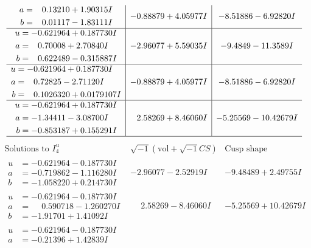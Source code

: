 \documentclass[1p]{elsarticle_modified}
\theoremstyle{definition}
\newcommand{\I}{\sqrt{-1}}
\begin{document}
$$\begin{array}{c|c|c}
\begin{aligned}
a &= \phantom{-}0.13210 + 1.90315 I \\
b &= \phantom{-}0.01117 - 1.83111 I\end{aligned}
 & -0.88879 + 4.05977 I & -8.51886 - 6.92820 I \\ \hline\begin{aligned}
u &= -0.621964 + 0.187730 I \\
a &= \phantom{-}0.70008 + 2.70840 I \\
b &= \phantom{-}0.622489 - 0.315887 I\end{aligned}
 & -2.96077 + 5.59035 I & -9.4849 - 11.3589 I \\ \hline\begin{aligned}
u &= -0.621964 + 0.187730 I \\
a &= \phantom{-}0.72825 - 2.71120 I \\
b &= \phantom{-}0.1026320 + 0.0179107 I\end{aligned}
 & -0.88879 + 4.05977 I & -8.51886 - 6.92820 I \\ \hline\begin{aligned}
u &= -0.621964 + 0.187730 I \\
a &= -1.34411 - 3.08700 I \\
b &= -0.853187 + 0.155291 I\end{aligned}
 & \phantom{-}2.58269 + 8.46060 I & -5.25569 - 10.42679 I\\
 \hline 
 \end{array}$$\newpage$$\begin{array}{c|c|c}  
\text{Solutions to }I^u_{4}& \I (\text{vol} + \sqrt{-1}CS) & \text{Cusp shape}\\
 \hline 
\begin{aligned}
u &= -0.621964 - 0.187730 I \\
a &= -0.719862 - 1.116280 I \\
b &= -1.058220 + 0.214730 I\end{aligned}
 & -2.96077 - 2.52919 I & -9.48489 + 2.49755 I \\ \hline\begin{aligned}
u &= -0.621964 - 0.187730 I \\
a &= \phantom{-}0.590718 - 1.260270 I \\
b &= -1.91701 + 1.41092 I\end{aligned}
 & \phantom{-}2.58269 - 8.46060 I & -5.25569 + 10.42679 I \\ \hline\begin{aligned}
u &= -0.621964 - 0.187730 I \\
a &= -0.21396 + 1.42839 I \\

\end{aligned}
\end{array}$$
\end{document}
